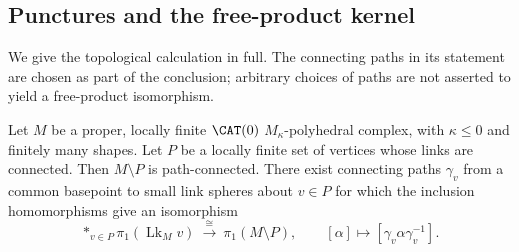 \subsection{Punctures and the free-product kernel}

We give the topological calculation in full. The connecting paths in
its statement are chosen as part of the conclusion; arbitrary choices
of paths are not asserted to yield a free-product isomorphism.

\begin{lemma}\label{lem:punctures}
Let \(M\) be a proper, locally finite \(\CAT(0)\)
\(M_\kappa\)-polyhedral complex, with \(\kappa\le0\) and finitely
many shapes. Let \(P\) be a locally finite set of vertices whose links
are connected. Then \(M\setminus P\) is path-connected. There exist
connecting paths \(\gamma_v\) from a common basepoint to small link
spheres about \(v\in P\) for which the inclusion homomorphisms give
an isomorphism
\begin{equation}\label{eq:puncture-product}
 \mathop{*}_{v\in P}\pi_1(\operatorname{Lk}_M v)
 \ \xrightarrow{\ \cong\ }\ \pi_1(M\setminus P),
 \qquad [\alpha]\longmapsto[\gamma_v\alpha\gamma_v^{-1}].
\end{equation}
\end{lemma}
